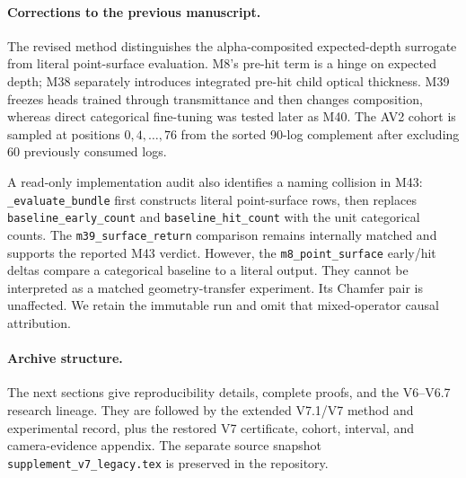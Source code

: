 \paragraph{Corrections to the previous manuscript.}
The revised method distinguishes the alpha-composited expected-depth surrogate from literal
point-surface evaluation. M8's pre-hit term is a hinge on expected depth; M38 separately introduces
integrated pre-hit child optical thickness. M39 freezes heads trained through transmittance and then
changes composition, whereas direct categorical fine-tuning was tested later as M40.
The AV2 cohort is sampled at positions $0,4,\ldots,76$ from the sorted 90-log complement after excluding
60 previously consumed logs.

A read-only implementation audit also identifies a naming collision in M43:
\texttt{\_evaluate\_bundle} first constructs literal point-surface rows, then replaces
\texttt{baseline\_early\_count} and \texttt{baseline\_hit\_count} with the unit categorical counts.
The \texttt{m39\_surface\_return} comparison remains internally matched and supports the reported M43
verdict. However, the \texttt{m8\_point\_surface} early/hit deltas compare a categorical baseline to a
literal output. They cannot be interpreted as a matched geometry-transfer experiment.
Its Chamfer pair is unaffected. We retain the immutable run and omit that mixed-operator causal attribution.

\paragraph{Archive structure.}
The next sections give reproducibility details, complete proofs, and the V6--V6.7 research lineage.
They are followed by the extended V7.1/V7 method and experimental record, plus the restored V7 certificate,
cohort, interval, and camera-evidence appendix.
The separate source snapshot \texttt{supplement\_v7\_legacy.tex} is preserved in the repository.

\clearpage
\setcounter{tocdepth}{2}
\tableofcontents
\clearpage
